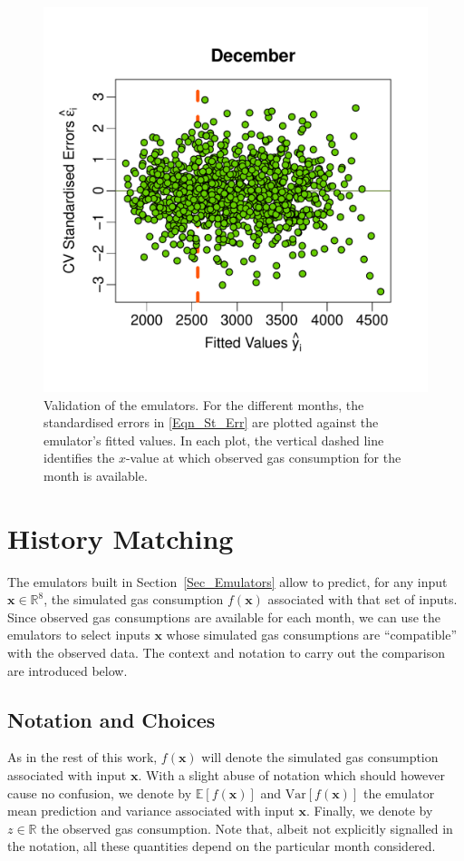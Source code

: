 \documentclass[a4paper, 12pt]{article}
\newcommand{\R}{\mathbb{R}}
\newcommand{\bd}[1]{\boldsymbol{#1}}
\newcommand{\x}{\bd x}
\newcommand{\E}{\mathbb{E}}
\newcommand{\Var}{\text{Var}}
\begin{document}
\begin{figure}
 \includegraphics[width=\scale]{Emulator_CV/ScatterPlots/December_CV_Scatter}
 \caption{Validation of the emulators. For the different months, the standardised errors in \eqref{Eqn_St_Err} are plotted against the emulator's fitted values. In each plot, the vertical dashed line identifies the $x$-value at which observed gas consumption for the month is available.}
 \label{Fig_Scatter_Errors}
\end{figure}
\newpage

\section{History Matching}

The emulators built in Section~\ref{Sec_Emulators} allow to predict, for any input $\x \in \R^8$, the simulated gas consumption $f(\x)$ associated with that set of inputs.
Since observed gas consumptions are available for each month, we can use the emulators to select inputs $\x$ whose simulated gas consumptions are ``compatible'' with the observed data.
The context and notation to carry out the comparison are introduced below. 


\subsection{Notation and Choices}
As in the rest of this work, $f(\x)$ will denote the simulated gas consumption associated with input $\x$. With a slight abuse of notation which should however cause no confusion, we denote by $\E[f(\x)]$ and $\Var[f(\x)]$ the emulator mean prediction and variance associated with input $\x$. Finally, we denote by $z \in \R$ the observed gas consumption. Note that, albeit not explicitly signalled in the notation, all these quantities depend on the particular month considered.
\end{document}
